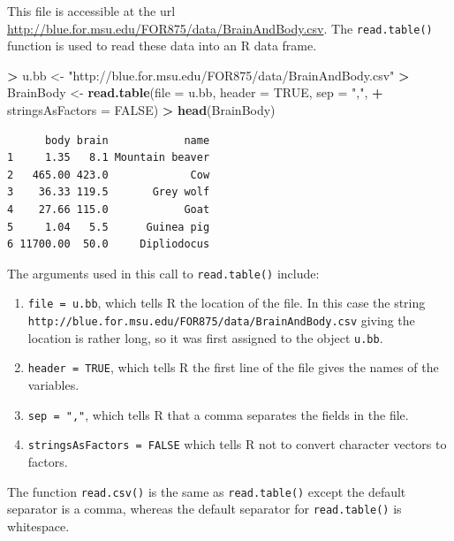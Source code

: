 \documentclass[]{krantz}
\makeatletter
\newenvironment{Shaded}{\begin{snugshade}}{\end{snugshade}}
\newcommand{\KeywordTok}[1]{\textcolor[rgb]{0.27,0.27,0.27}{\textbf{#1}}}
\newcommand{\DataTypeTok}[1]{\textcolor[rgb]{0.27,0.27,0.27}{#1}}
\newcommand{\StringTok}[1]{\textcolor[rgb]{0.5,0.5,0.5}{#1}}
\newcommand{\OtherTok}[1]{\textcolor[rgb]{0.37,0.37,0.37}{#1}}
\newcommand{\OperatorTok}[1]{\textcolor[rgb]{0.43,0.43,0.43}{\textbf{#1}}}
\newcommand{\NormalTok}[1]{#1}
\providecommand{\tightlist}{%
  \setlength{\itemsep}{0pt}\setlength{\parskip}{0pt}}
\newenvironment{kframe}{%
\medskip{}
\setlength{\fboxsep}{.8em}
 \def\at@end@of@kframe{}%
 \ifinner\ifhmode%
  \def\at@end@of@kframe{\end{minipage}}%
  \begin{minipage}{\columnwidth}%
 \fi\fi%
 \def\FrameCommand##1{\hskip\@totalleftmargin \hskip-\fboxsep
 \colorbox{shadecolor}{##1}\hskip-\fboxsep
     \hskip-\linewidth \hskip-\@totalleftmargin \hskip\columnwidth}%
 \MakeFramed {\advance\hsize-\width
   \@totalleftmargin\z@ \linewidth\hsize
   \@setminipage}}%
 {\par\unskip\endMakeFramed%
 \at@end@of@kframe}
\renewenvironment{Shaded}{\begin{kframe}}{\end{kframe}}
\makeatother
\begin{document}
This file is accessible at the url
\url{http://blue.for.msu.edu/FOR875/data/BrainAndBody.csv}. The
\texttt{read.table()} function is used to read these data into an R data
frame.

\begin{Shaded}
\begin{Highlighting}[]
\OperatorTok{>}\StringTok{ }\NormalTok{u.bb <-}\StringTok{ "http://blue.for.msu.edu/FOR875/data/BrainAndBody.csv"}
\OperatorTok{>}\StringTok{ }\NormalTok{BrainBody <-}\StringTok{ }\KeywordTok{read.table}\NormalTok{(}\DataTypeTok{file =}\NormalTok{ u.bb, }\DataTypeTok{header =} \OtherTok{TRUE}\NormalTok{, }\DataTypeTok{sep =} \StringTok{","}\NormalTok{, }
\OperatorTok{+}\StringTok{                         }\DataTypeTok{stringsAsFactors =} \OtherTok{FALSE}\NormalTok{)}
\OperatorTok{>}\StringTok{ }\KeywordTok{head}\NormalTok{(BrainBody)}
\end{Highlighting}
\end{Shaded}

\begin{verbatim}
      body brain            name
1     1.35   8.1 Mountain beaver
2   465.00 423.0             Cow
3    36.33 119.5       Grey wolf
4    27.66 115.0            Goat
5     1.04   5.5      Guinea pig
6 11700.00  50.0     Dipliodocus
\end{verbatim}

The arguments used in this call to \texttt{read.table()} include:

\begin{enumerate}
\def\labelenumi{\arabic{enumi}.}
\tightlist
\item
  \texttt{file\ =\ u.bb}, which tells R the location of the file. In
  this case the string
  \texttt{http://blue.for.msu.edu/FOR875/data/BrainAndBody.csv} giving
  the location is rather long, so it was first assigned to the object
  \texttt{u.bb}.
\item
  \texttt{header\ =\ TRUE}, which tells R the first line of the file
  gives the names of the variables.
\item
  \texttt{sep\ =\ ","}, which tells R that a comma separates the fields
  in the file.
\item
  \texttt{stringsAsFactors\ =\ FALSE} which tells R not to convert
  character vectors to factors.
\end{enumerate}

The function \texttt{read.csv()} is the same as \texttt{read.table()}
except the default separator is a comma, whereas the default separator
for \texttt{read.table()} is whitespace.
\end{document}
